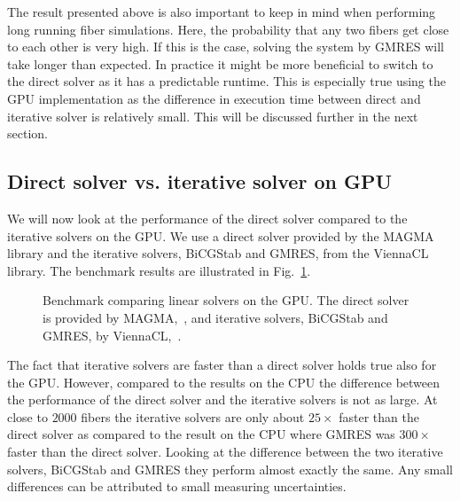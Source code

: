 The result presented above is also important to keep in mind when performing long running fiber simulations. Here, the probability that any two fibers get close to each other is very high. If this is the case, solving the system by GMRES will take longer than expected. In practice it might be more beneficial to switch to the direct solver as it has a predictable runtime. This is especially true using the GPU implementation as the difference in execution time between direct and iterative solver is relatively small. This will be discussed further in the next section.

\subsection{Direct solver vs. iterative solver on GPU}
We will now look at the performance of the direct solver compared to the iterative solvers on the GPU. We use a direct solver provided by the MAGMA library and the iterative solvers, BiCGStab and GMRES, from the ViennaCL library. The benchmark results are illustrated in Fig.~\ref{fig:bench_cuda_solvers}.

\begin{figure}[htbp]
  \centering
  \caption[Benchmark linear solvers on GPU.]{Benchmark comparing linear solvers on the GPU. The direct solver is provided by MAGMA,~\cite{MagmaDocumentation}, and iterative solvers, BiCGStab and GMRES, by ViennaCL,~\cite{ViennaCLRupp2010}.}
  \label{fig:bench_cuda_solvers}
\end{figure}

The fact that iterative solvers are faster than a direct solver holds true also for the GPU. However, compared to the results on the CPU the difference between the performance of the direct solver and the iterative solvers is not as large. At close to $2000$ fibers the iterative solvers are only about $25×$ faster than the direct solver as compared to the result on the CPU where GMRES was $300×$ faster than the direct solver. Looking at the difference between the two iterative solvers, BiCGStab and GMRES they perform almost exactly the same. Any small differences can be attributed to small measuring uncertainties. 

